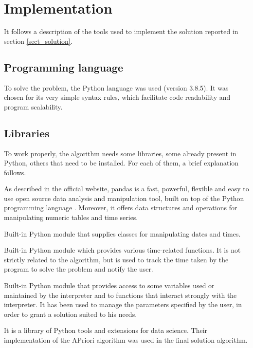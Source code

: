 
\section{Implementation}\label{sect_impl}
It follows a description of the tools used to implement the solution reported in section \ref{sect_solution}.

\subsection*{Programming language}
To solve the problem, the Python language was used (version 3.8.5). It was chosen for its very simple syntax rules, which facilitate code readability and program scalability.

\subsection*{Libraries}
To work properly, the algorithm needs some libraries, some already present in Python, others that need to be installed. For each of them, a brief explanation follows.

\vspace{2mm}
 As described in the official website, pandas is a fast, powerful, flexible and easy to use open source data analysis and manipulation tool, built on top of the Python programming language \cite{pandas}. Moreover, it offers data structures and operations for manipulating numeric tables and time series.

\vspace{2mm}
 Built-in Python module that supplies classes for manipulating dates and times.

\vspace{2mm}
 Built-in Python module which provides various time-related functions. It is not strictly related to the algorithm, but is used to track the time taken by the program to solve the problem and notify the user.

\vspace{2mm}
 Built-in Python module that provides access to some variables used or maintained by the interpreter and to functions that interact strongly with the interpreter. It has been used to manage the parameters specified by the user, in order to grant a solution suited to his needs.

\vspace{2mm}
 It is a library of Python tools and extensions for data science. Their implementation of the APriori algorithm was used in the final solution algorithm.

